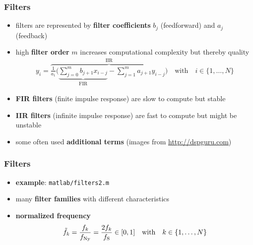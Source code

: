 \begin{frame} %
	\frametitle{Filters}
	\begin{itemize}
		\item filters are represented by \textbf{filter coefficients} $b_j$ (feedforward) and $a_j$ (feedback)
		\item high \textbf{filter order} $m$ increases computational complexity but thereby quality
			\begin{align*}
				y_i=\overbrace{\frac1{a_1}\Bigg(\underbrace{\sum_{j=0}^mb_{j+1}x_{i-j}}_{\textrm{FIR}}-\sum_{j=1}^ma_{j+1}y_{i-j}\Bigg)}^{\textrm{IIR}}\quad\textrm{with}\quad i\in\{1,\ldots,N\}
			\end{align*}
		\item \textbf{FIR filters} (finite impulse response) are slow to compute but stable
		\item \textbf{IIR filters} (infinite impulse response) are fast to compute but might be unstable
		\item some often used \textbf{additional terms} (images from \url{http://dspguru.com})
			\begin{figure}
				\centering
				\begin{subfigure}[c]{0.48\linewidth}
				\end{subfigure}
				\hspace{0.01\linewidth}
				\begin{subfigure}[c]{0.48\linewidth}
				\end{subfigure}
			\end{figure}
	\end{itemize}
\end{frame}

\begin{frame} %
	\frametitle{Filters}
	\begin{itemize}
		\item \textbf{example}: \texttt{matlab/filters2.m}
			\begin{figure}
				\centering
				\begin{subfigure}[c]{0.8\linewidth}
				\end{subfigure}
			\end{figure}
		\item many \textbf{filter families} with different characteristics
		\item \textbf{normalized frequency}
			\begin{align*}
				\tilde f_k=\frac{f_k}{f_{\textrm{Ny}}}=\frac{2f_k}{f_{\textrm S}}\in[0,1]\quad\textrm{with}\quad k\in\{1,\ldots,N\}
			\end{align*}
	\end{itemize}
\end{frame}

